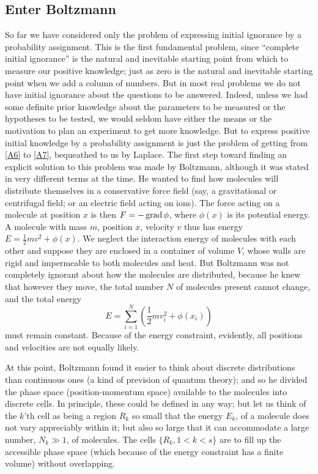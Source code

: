 \subsection*{Enter Boltzmann}
So far we have considered only the problem of expressing initial ignorance by a probability assignment.
This is the first fundamental problem, since ``complete initial ignorance'' is the natural and inevitable starting point from which to measure our positive knowledge; just as zero is the natural and inevitable starting point when we add a column of numbers.
But in most real problems we do not have initial ignorance about the questions to be answered.
Indeed, unless we had some definite prior knowledge about the parameters to be measured or the hypotheses to be tested, we would seldom have either the means or the motivation to plan an experiment to get more knowledge.
But to express positive initial knowledge by a probability assignment is just the problem of getting from \eqref{A6} to \eqref{A7}, bequeathed to us by Laplace.
The first step toward finding an explicit solution to this problem was made by Boltzmann, although it was stated in very different terms at the time.
He wanted to find how molecules will distribute themselves in a conservative force field (say, a gravitational or centrifugal field; or an electric field acting on ions).
The force acting on a molecule at position $x$ is then $F=-\operatorname{grad} \phi$, where $\phi(x)$ is its potential energy.
A molecule with mass $m$, position $x$, velocity $v$ thus has energy $E= \frac{1}{2}mv^2 +\phi(x)$.
We neglect the interaction energy of molecules with each other and suppose they are enclosed in a container of volume $V$, whose walls are rigid and impermeable to both molecules and heat.
But Boltzmann was not completely ignorant about how the molecules are distributed, because he knew that however they move, the total number $N$ of molecules present cannot change, and the total energy
\begin{equation}
	\label{A10}
	E = \sum_{i=1}^{N} \left(\frac{1}{2}mv_i^2 + \phi(x_i)\right)
\end{equation}
must remain constant.
Because of the energy constraint, evidently, all positions and velocities are not equally likely.

At this point, Boltzmann found it easier to think about discrete distributions than continuous ones (a kind of prevision of quantum theory); and so he divided the phase space (position-momentum space) available to the molecules into discrete cells.
In principle, these could be defined in any way; but let us think of the $k$'th cell as being a region $R_k$ so small that the energy $E_k$, of a molecule does not vary appreciably within it; but also so large that it can accommodate a large number, $N_k \gg 1$, of molecules.
The cells $\{R_k, 1<k<s\}$ are to fill up the accessible phase space (which because of the energy constraint has a finite volume) without overlapping.

